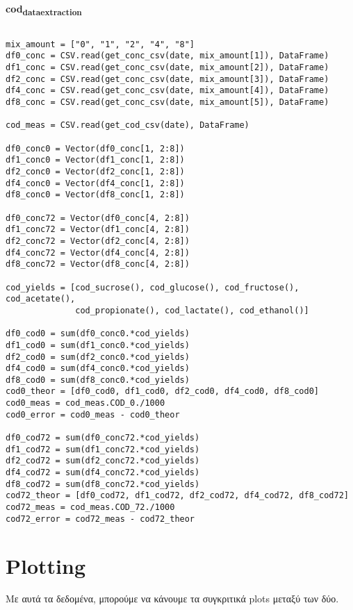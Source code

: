 \documentclass[11pt]{article}
\begin{document}
\textbf{cod\textsubscript{data}\textsubscript{extraction}}
\begin{verbatim}

mix_amount = ["0", "1", "2", "4", "8"]
df0_conc = CSV.read(get_conc_csv(date, mix_amount[1]), DataFrame)
df1_conc = CSV.read(get_conc_csv(date, mix_amount[2]), DataFrame)
df2_conc = CSV.read(get_conc_csv(date, mix_amount[3]), DataFrame)
df4_conc = CSV.read(get_conc_csv(date, mix_amount[4]), DataFrame)
df8_conc = CSV.read(get_conc_csv(date, mix_amount[5]), DataFrame)

cod_meas = CSV.read(get_cod_csv(date), DataFrame)

df0_conc0 = Vector(df0_conc[1, 2:8])
df1_conc0 = Vector(df1_conc[1, 2:8])
df2_conc0 = Vector(df2_conc[1, 2:8])
df4_conc0 = Vector(df4_conc[1, 2:8])
df8_conc0 = Vector(df8_conc[1, 2:8])

df0_conc72 = Vector(df0_conc[4, 2:8])
df1_conc72 = Vector(df1_conc[4, 2:8])
df2_conc72 = Vector(df2_conc[4, 2:8])
df4_conc72 = Vector(df4_conc[4, 2:8])
df8_conc72 = Vector(df8_conc[4, 2:8])

cod_yields = [cod_sucrose(), cod_glucose(), cod_fructose(), cod_acetate(),
              cod_propionate(), cod_lactate(), cod_ethanol()]

df0_cod0 = sum(df0_conc0.*cod_yields)
df1_cod0 = sum(df1_conc0.*cod_yields)
df2_cod0 = sum(df2_conc0.*cod_yields)
df4_cod0 = sum(df4_conc0.*cod_yields)
df8_cod0 = sum(df8_conc0.*cod_yields)
cod0_theor = [df0_cod0, df1_cod0, df2_cod0, df4_cod0, df8_cod0]
cod0_meas = cod_meas.COD_0./1000
cod0_error = cod0_meas - cod0_theor

df0_cod72 = sum(df0_conc72.*cod_yields)
df1_cod72 = sum(df1_conc72.*cod_yields)
df2_cod72 = sum(df2_conc72.*cod_yields)
df4_cod72 = sum(df4_conc72.*cod_yields)
df8_cod72 = sum(df8_conc72.*cod_yields)
cod72_theor = [df0_cod72, df1_cod72, df2_cod72, df4_cod72, df8_cod72]
cod72_meas = cod_meas.COD_72./1000
cod72_error = cod72_meas - cod72_theor

\end{verbatim}

\section{Plotting}
\label{sec:org993e69d}
Με αυτά τα δεδομένα, μπορούμε να κάνουμε τα συγκριτικά plots μεταξύ των δύο.
\end{document}

